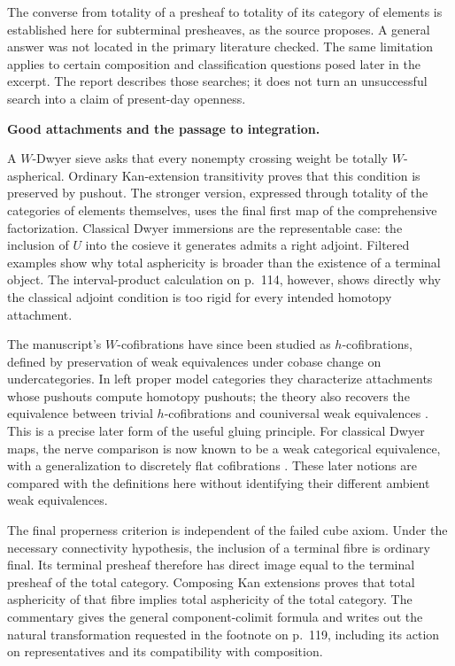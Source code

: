 The converse from totality of a presheaf to totality of its category of elements is established here for subterminal presheaves, as the source proposes. A general answer was not located in the primary literature checked. The same limitation applies to certain composition and classification questions posed later in the excerpt. The report describes those searches; it does not turn an unsuccessful search into a claim of present-day openness.

\medskip
{}
\noindent\textbf{Good attachments and the passage to integration.}

A $W$-Dwyer sieve asks that every nonempty crossing weight be totally $W$-aspherical. Ordinary Kan-extension transitivity proves that this condition is preserved by pushout. The stronger version, expressed through totality of the categories of elements themselves, uses the final first map of the comprehensive factorization. Classical Dwyer immersions are the representable case: the inclusion of $U$ into the cosieve it generates admits a right adjoint. Filtered examples show why total asphericity is broader than the existence of a terminal object. The interval-product calculation on p.~114, however, shows directly why the classical adjoint condition is too rigid for every intended homotopy attachment.

The manuscript's $W$-cofibrations have since been studied as $h$-cofibrations, defined by preservation of weak equivalences under cobase change on undercategories. In left proper model categories they characterize attachments whose pushouts compute homotopy pushouts; the theory also recovers the equivalence between trivial $h$-cofibrations and couniversal weak equivalences \citep[Proposition~1.6, Corollary~1.9 and Lemma~1.10]{BataninBerger2017}. This is a precise later form of the useful gluing principle. For classical Dwyer maps, the nerve comparison is now known to be a weak categorical equivalence, with a generalization to discretely flat cofibrations \citep[Theorems~1.5--1.6]{HackneyOzornovaRiehlRovelli2024}. These later notions are compared with the definitions here without identifying their different ambient weak equivalences.

The final properness criterion is independent of the failed cube axiom. Under the necessary connectivity hypothesis, the inclusion of a terminal fibre is ordinary final. Its terminal presheaf therefore has direct image equal to the terminal presheaf of the total category. Composing Kan extensions proves that total asphericity of that fibre implies total asphericity of the total category. The commentary gives the general component-colimit formula and writes out the natural transformation requested in the footnote on p.~119, including its action on representatives and its compatibility with composition.

